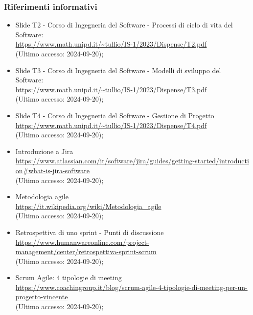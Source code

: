 \subsubsection{Riferimenti informativi}
\begin{itemize}
  \item Slide T2 - Corso di Ingegneria del Software - Processi di ciclo di vita del Software: \\ \href{https://www.math.unipd.it/~tullio/IS-1/2023/Dispense/T2.pdf}{https://www.math.unipd.it/\textasciitilde tullio/IS-1/2023/Dispense/T2.pdf}  \\ (Ultimo accesso: 2024-09-20);
  \item Slide T3 - Corso di Ingegneria del Software - Modelli di sviluppo del Software: \\ \href{https://www.math.unipd.it/~tullio/IS-1/2023/Dispense/T3.pdf}{https://www.math.unipd.it/\textasciitilde tullio/IS-1/2023/Dispense/T3.pdf}  \\ (Ultimo accesso: 2024-09-20);
  \item Slide T4 - Corso di Ingegneria del Software - Gestione di Progetto \\ \href{https://www.math.unipd.it/~tullio/IS-1/2023/Dispense/T4.pdf}{https://www.math.unipd.it/\textasciitilde tullio/IS-1/2023/Dispense/T4.pdf}  \\ (Ultimo accesso: 2024-09-20);
  \item Introduzione a Jira \\ \href{https://www.atlassian.com/it/software/jira/guides/getting-started/introduction#what-is-jira-software}{https://www.atlassian.com/it/software/jira/guides/getting-started/introducti \- on\#what-is-jira-software}  \\ (Ultimo accesso: 2024-09-20);
  \item Metodologia agile \\ \href{https://it.wikipedia.org/wiki/Metodologia_agile}{https://it.wikipedia.org/wiki/Metodologia\_agile}  \\ (Ultimo accesso: 2024-09-20);
  \item Retrospettiva di uno sprint - Punti di discussione \\ \href{https://www.humanwareonline.com/project-management/center/retrospettiva-sprint-scrum}{https://www.humanwareonline.com/project-management/center/retrospettiva-sprint-scrum}  \\ (Ultimo accesso: 2024-09-20);
  \item Scrum Agile: 4 tipologie di meeting \\ \href{https://www.coachingroup.it/blog/scrum-agile-4-tipologie-di-meeting-per-un-progetto-vincente}{https://www.coachingroup.it/blog/scrum-agile-4-tipologie-di-meeting-per-un-progetto-vincente}  \\ (Ultimo accesso: 2024-09-20);

\end{itemize}
